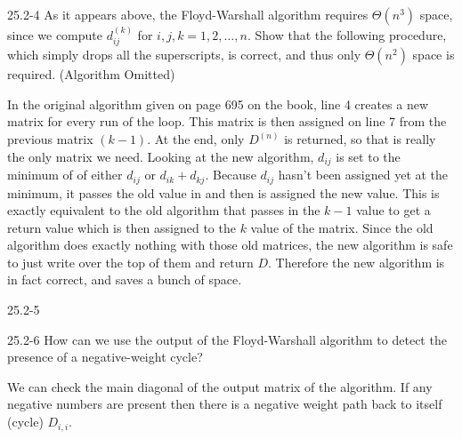 \begin{problem}{25.2-4}
  As it appears above, the Floyd-Warshall algorithm requires $\Theta(n^3)$ space, since we compute $d_{ij}^{(k)}$ for
  $i, j, k = 1, 2, \ldots, n$. Show that the following procedure, which simply drops all the superscripts, is correct,
  and thus only $\Theta(n^2)$ space is required.
  \br
  (Algorithm Omitted)
  \begin{solution}
    In the original algorithm given on page 695 on the book, line 4 creates a new matrix for every run of the loop.
    This matrix is then assigned on line 7 from the previous matrix $(k - 1)$.
    \br
    At the end, only $D^{(n)}$ is returned, so that is really the only matrix we need.
    \br
    Looking at the new algorithm, $d_{ij}$ is set to the minimum of of either $d_{ij}$ or $d_{ik} + d_{kj}$. Because 
    $d_{ij}$ hasn't been assigned yet at the minimum, it passes the old value in and then is assigned the new value.
    This is exactly equivalent to the old algorithm that passes in the $k - 1$ value to get a return value which is then
    assigned to the $k$ value of the matrix.
    \br
    Since the old algorithm does exactly nothing with those old matrices, the new algorithm is safe to just write over
    the top of them and return $D$.
    \br
    Therefore the new algorithm is in fact correct, and saves a bunch of space.
  \end{solution}
\end{problem}

\begin{problem}{25.2-5}

\end{problem}

\begin{problem}{25.2-6}
  How can we use the output of the Floyd-Warshall algorithm to detect the presence of a negative-weight cycle?
  \begin{solution}
    We can check the main diagonal of the output matrix of the algorithm.  If any negative numbers are present then
    there is a negative weight path back to itself (cycle) $D_{i,i}$.
  \end{solution}
\end{problem}


